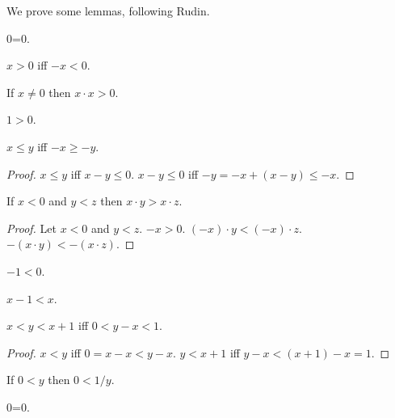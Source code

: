 \documentclass{article}
\begin{document}
We prove some lemmas, following Rudin.
\begin{forthel}

\begin{lemma}0=0.\end{lemma}

\begin{proposition}
$x > 0$ iff $-x < 0$.
\end{proposition}

\begin{proposition}
If $x \neq 0$ then $x \cdot x > 0$.
\end{proposition}

\begin{proposition}
$1 > 0$.
\end{proposition}

\begin{proposition}
$x \leq y$ iff $-x \geq -y$.
\end{proposition}
\begin{proof}
$x \leq y$ iff $x - y \leq 0$.  
$x - y \leq 0$ iff $-y = -x + (x - y) \leq -x$.
\end{proof}

\begin{proposition}
If $x < 0$ and $y < z$ then
$x \cdot y > x \cdot z$.
\end{proposition}
\begin{proof}
Let $x < 0$ and $y < z$.
$-x > 0$.
$(-x)\cdot y < (-x)\cdot z$.
$-(x\cdot y) < -(x\cdot z)$.
\end{proof}

\begin{proposition}
$-1 < 0$.
\end{proposition}

\begin{proposition}
$x - 1 < x$.
\end{proposition}

\begin{proposition}
$x < y < x + 1$ iff $0 < y - x < 1$.
\end{proposition}
\begin{proof}
$x < y$ iff $0 = x - x < y - x$.
$y < x + 1$ iff $y - x < (x + 1) - x = 1$.
\end{proof}

\begin{proposition}
If $0 < y$ then $0 < 1/y$.
\end{proposition}

\begin{lemma} 0=0. \end{lemma}


\end{forthel}
\end{document}
